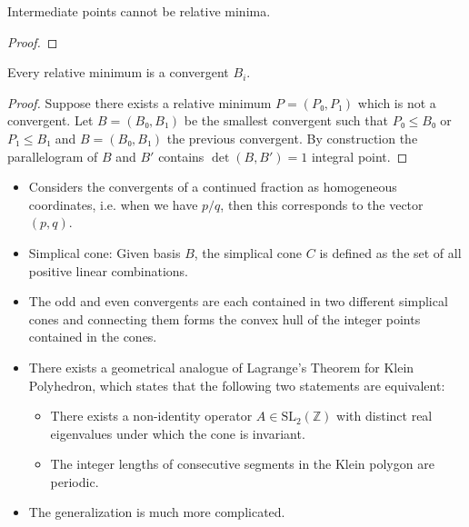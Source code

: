 \begin{lemma}
  Intermediate points cannot be relative minima.
\end{lemma}

\begin{proof}

\end{proof}

\begin{theorem}
  Every relative minimum is a convergent $B_i$.
\end{theorem}

\begin{proof}
  Suppose there exists a relative minimum $P = (P₀, P₁)$ which is not a convergent.
  Let $B = (B₀, B₁)$ be the smallest convergent such that $P₀ ≤ B₀$ or $P₁ ≤ B₁$
  and $B = (B₀, B₁)$ the previous convergent.
  By construction the parallelogram of $B$ and $B'$ contains $\det(B, B') = 1$ integral point.
\end{proof}

\begin{itemize}
  \item Considers the convergents of a continued fraction as homogeneous coordinates,
    i.e. when we have $p / q$, then this corresponds to the vector $(p, q)$.
  \item Simplical cone: Given basis $B$, the simplical cone $C$ is defined as
    the set of all positive linear combinations.
  \item
    The odd and even convergents are each contained in two different simplical cones
    and connecting them forms the convex hull of the integer points contained in the cones.
  \item
    There exists a geometrical analogue of Lagrange's Theorem for Klein Polyhedron,
    which states that the following two statements are equivalent:
    \begin{itemize}
      \item
        There exists a non-identity operator $A ∈ \mathrm{SL}_2(ℤ)$ with
        distinct real eigenvalues under which the cone is invariant.
      \item
        The integer lengths of consecutive segments in the Klein polygon are periodic.
    \end{itemize}
  \item The generalization is much more complicated.
\end{itemize}


